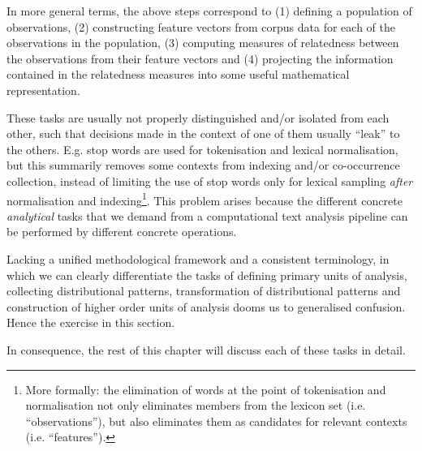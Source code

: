 In more general terms, the above steps correspond to
(1) defining a population of observations,
(2) constructing feature vectors from corpus data for each of the observations in the population,
(3) computing measures of relatedness between the observations from their feature vectors and
(4) projecting the information contained in the relatedness measures into some useful mathematical representation.

These tasks are usually not properly distinguished and/or isolated from each other, such that decisions made in the context of one of them usually ``leak'' to the others.
E.g. stop words are used for tokenisation and lexical normalisation, but this summarily removes some contexts from indexing and/or co-occurrence collection, instead of limiting the use of stop words only for lexical sampling \emph{after} normalisation and indexing\footnote{
    More formally: the elimination of words at the point of tokenisation and normalisation not only eliminates members from the lexicon set (i.e. ``observations''), but also eliminates them as candidates for relevant contexts (i.e. ``features'').
}.
This problem arises because the different concrete \emph{analytical} tasks that we demand from a computational text analysis pipeline can be performed by different concrete operations.


Lacking a unified methodological framework and a consistent terminology, in which we can clearly differentiate the tasks of defining primary units of analysis, collecting distributional patterns, transformation of distributional patterns and construction of higher order units of analysis dooms us to generalised confusion.
Hence the exercise in this section.

In consequence, the rest of this chapter will discuss each of these tasks in detail.

